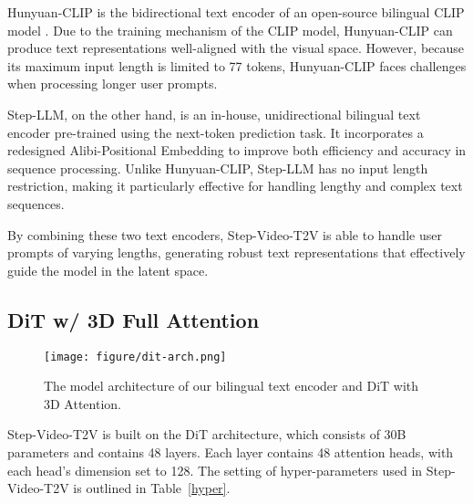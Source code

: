 Hunyuan-CLIP is the bidirectional text encoder of an open-source bilingual CLIP model \cite{li2024hunyuanditpowerfulmultiresolutiondiffusion}. Due to the training mechanism of the CLIP model, Hunyuan-CLIP can produce text representations well-aligned with the visual space. However, because its maximum input length is limited to 77 tokens, Hunyuan-CLIP faces challenges when processing longer user prompts.

Step-LLM, on the other hand, is an in-house, unidirectional bilingual text encoder pre-trained using the next-token prediction task. It incorporates a redesigned Alibi-Positional Embedding \cite{press2022trainshorttestlong} to improve both efficiency and accuracy in sequence processing. Unlike Hunyuan-CLIP, Step-LLM has no input length restriction, making it particularly effective for handling lengthy and complex text sequences.

By combining these two text encoders, Step-Video-T2V is able to handle user prompts of varying lengths, generating robust text representations that effectively guide the model in the latent space.

\subsection{DiT w/ 3D Full Attention}


\begin{figure}[h]
    \centering
    \texttt{[image: figure/dit-arch.png]}
    \caption{The model architecture of our bilingual text encoder  and DiT with 3D Attention.}
\end{figure}


\begin{table}[ht]
\centering
{}
\caption{Hyper-parameters used in Step-Video-T2V.}
\label{hyper}
\end{table}

Step-Video-T2V is built on the DiT \cite{peebles2023scalablediffusionmodelstransformers} architecture, which consists of 30B parameters and contains 48 layers. Each layer contains 48 attention heads, with each head’s dimension set to 128. The setting of hyper-parameters used in Step-Video-T2V is outlined in Table~\ref{hyper}.

